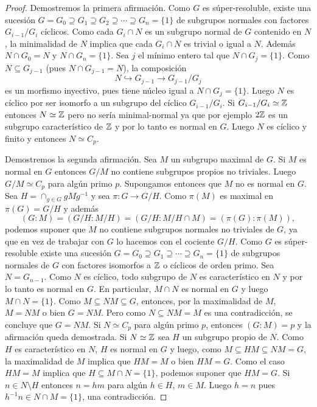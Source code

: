 \begin{proof}
	Demostremos la primera afirmación. 
	Como $G$ es súper-resoluble, existe una sucesión $G=G_0\supseteq G_1\supseteq
	G_2\supseteq\cdots\supseteq G_n=\{1\}$ de subgrupos normales con factores
	$G_{i-1}/G_i$ cíclicos. Como cada $G_i\cap N$ es un subgrupo normal de $G$ contenido en $N$, la
	minimalidad de $N$ implica que 
	cada $G_i\cap N$ es trivial o igual a $N$. Además $N\cap G_0=N$ y $N\cap
	G_n=\{1\}$. Sea $j$ el mínimo entero tal que $N\cap G_j=\{1\}$. Como $N\subseteq
	G_{j-1}$ (pues $N\cap G_{j-1}=N$), la composición
	\[
	N\hookrightarrow G_{j-1}\to G_{j-1}/G_j
	\]
	es un morfismo inyectivo, pues tiene núcleo igual a $N\cap G_{j}=\{1\}$. Luego $N$ es
	cíclico por ser isomorfo a un subgrupo del cíclico $G_{i-1}/G_i$. Si
	$G_{i-1}/G_i\simeq\mathbb{Z}$ entonces $N\simeq\mathbb{Z}$ pero no sería minimal-normal ya
	que por ejemplo $2\mathbb{Z}$ es un subgrupo característico de $\mathbb{Z}$ y por lo tanto
	es normal en $G$. Luego $N$ es cíclico y finito y entonces $N\simeq C_p$. 

	Demostremos la segunda afirmación. Sea $M$ un subgrupo maximal de $G$. 
	Si $M$ es normal en $G$ entonces $G/M$ no contiene subgrupos propios no
	triviales. 
	Luego $G/M\simeq C_p$ para algún
	primo $p$.  Supongamos entonces que $M$ no es normal en $G$. Sea $H=\cap_{g\in
	G}gMg^{-1}$ y sea $\pi\colon G\to G/H$.  Como $\pi(M)$ es maximal en
	$\pi(G)=G/H$ y además
	\[
		(G:M)=(G/H:M/H)=(G/H:M/H\cap M)=(\pi(G):\pi(M)),
	\]
	podemos suponer que $M$ no contiene subgrupos normales no triviales de $G$, ya 
	que en vez de trabajar con $G$ lo hacemos con el cociente $G/H$. 
	Como $G$ es súper-resoluble
	existe una sucesión $G=G_0\supseteq G_1\supseteq\cdots\supseteq G_n=\{1\}$ de
	subgrupos normales de $G$ con factores isomorfos a $\mathbb{Z}$ o cíclicos de orden primo.
	Sea $N=G_{n-1}$. Como $N$ es cíclico, todo subgrupo de $N$ es característico en
	$N$ y por lo tanto es normal en $G$. En particular, $M\cap N$ es normal en
	$G$ y luego $M\cap N=\{1\}$. Como $M\subseteq
	NM\subseteq G$, entonces, por la maximalidad de $M$, $M=NM$ o bien $G=NM$.
	Pero como $N\subseteq NM=M$ es una contradicción, se concluye que $G=NM$.
	Si $N\simeq C_p$ para algún primo $p$, entonces $(G:M)=p$ y la afirmación
	queda demostrada.  Si $N\simeq\mathbb{Z}$ sea $H$ un subgrupo propio de $N$. Como
	$H$ es característico en $N$, $H$ es normal en $G$ y luego, como
	$M\subseteq HM\subseteq NM=G$, la maximalidad de $M$ implica que $HM=M$ o
	bien $HM=G$. Como el caso $HM=M$ implica que $H\subseteq M\cap N=\{1\}$,
	podemos suponer que $HM=G$. Si $n\in N\setminus H$ entonces $n=hm$ para
	algún $h\in H$, $m\in M$. Luego $h=n$ pues $h^{-1}n\in N\cap M=\{1\}$, una
	contradicción.


\end{proof}
